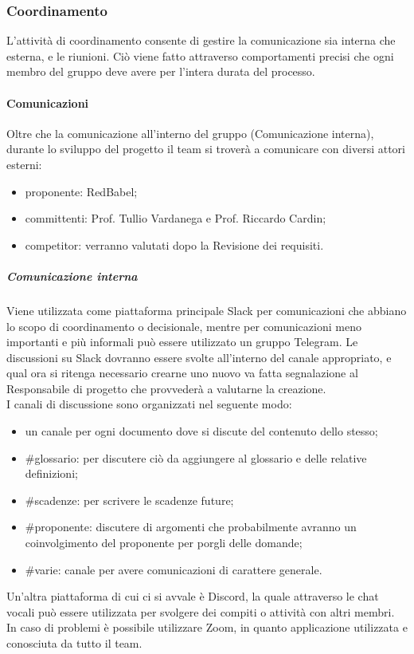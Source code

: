 \subsubsection{Coordinamento}
L'attività di coordinamento consente di gestire la comunicazione sia interna che esterna, e le riunioni. Ciò viene fatto attraverso comportamenti precisi che ogni membro del gruppo deve avere per l'intera durata del processo.

\paragraph{Comunicazioni}
Oltre che la comunicazione all'interno del gruppo (Comunicazione interna), durante lo sviluppo del progetto il team si troverà a comunicare con diversi attori esterni:
\begin{itemize}
    \item proponente: RedBabel;
    \item committenti: Prof. Tullio Vardanega e Prof. Riccardo Cardin;
    \item competitor: verranno valutati dopo la Revisione dei requisiti.
\end{itemize}

\subparagraph{Comunicazione interna}
Viene utilizzata come piattaforma principale Slack per comunicazioni che abbiano lo scopo di coordinamento o decisionale, mentre per comunicazioni meno importanti e più informali può essere utilizzato un gruppo Telegram.
Le discussioni su Slack dovranno essere svolte all'interno del canale appropriato, e qual ora si ritenga necessario crearne uno nuovo va fatta segnalazione al Responsabile di progetto che provvederà a valutarne la creazione.\\
I canali di discussione sono organizzati nel seguente modo:
\begin{itemize}
    \item un canale per ogni documento dove si discute del contenuto dello stesso;
    \item {\#glossario:} per discutere ciò da aggiungere al glossario e delle relative definizioni;
    \item {\#scadenze:} per scrivere le scadenze future;
    \item {\#proponente:} discutere di argomenti che probabilmente avranno un coinvolgimento del proponente per porgli delle domande;
    \item {\#varie:} canale per avere comunicazioni di carattere generale.
\end{itemize}
Un'altra piattaforma di cui ci si avvale è Discord, la quale attraverso le chat vocali può essere utilizzata per svolgere dei compiti o attività con altri membri. In caso di problemi è possibile utilizzare Zoom, in quanto applicazione utilizzata e conosciuta da tutto il team.

